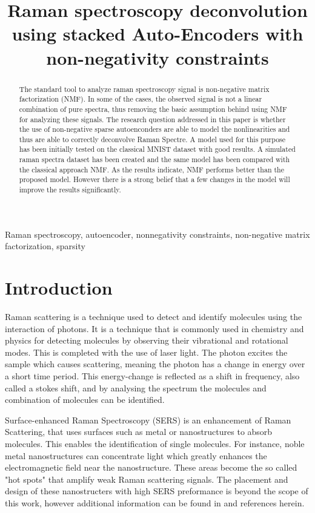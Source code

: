 \documentclass{article}
\title{Raman spectroscopy deconvolution using stacked Auto-Encoders with non-negativity constraints}
\begin{document}
%

\maketitle
%
\begin{abstract}
The standard tool to analyze raman spectroscopy signal is non-negative matrix factorization (NMF). In some of the cases, the observed signal is not a linear combination of pure spectra, thus removing the basic assumption behind using NMF for analyzing these signals. The research question addressed in this paper is whether the use of non-negative sparse autoenconders are able to model the nonlinearities and thus are able to correctly deconvolve Raman Spectre. A model used for this purpose has been initially tested on the classical MNIST dataset with good results. A simulated raman spectra dataset has been created and the same model has been compared with the classical approach NMF. As the results indicate, NMF performs better than the proposed model. However there is a strong belief that a few changes in the model will improve the results significantly.
\end{abstract}
%
\begin{keywords}
Raman spectroscopy, autoencoder, nonnegativity constraints, non-negative matrix factorization, sparsity
\end{keywords}
%
\section{Introduction}
\label{sec:intro}

Raman scattering is a technique used to detect and identify molecules using the interaction of photons. It is a technique that is commonly used in chemistry and physics for detecting molecules by observing their vibrational and rotational modes. This is completed with the use of laser light. The photon excites the sample which causes scattering, meaning the photon has a change in energy over a short time period. This energy-change is reflected as a shift in frequency, also called a stokes shift, and by analysing the spectrum the molecules and combination of molecules can be identified. 

Surface-enhanced Raman Spectroscopy (SERS) is an enhancement of Raman Scattering, that uses surfaces such as metal or nanostructures to absorb molecules. This enables the identification of single molecules.  For instance, noble metal nanostructures can concentrate light which greatly enhances the electromagnetic field near the nanostructure. These areas become the so called "hot spots" that amplify weak Raman scattering signals. The placement and design of these nanostructers with high SERS preformance is beyond the scope of this work, however additional information can be found in \cite{Wei2013} and references herein.
\end{document}
